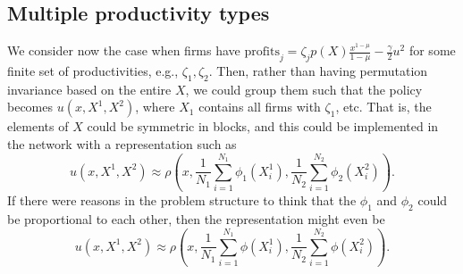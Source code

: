\documentclass[12pt]{article}
\newcommand{\mapvar}[2][map]{\csname #1#2\endcsname}
\begin{document}


\subsection{Multiple productivity types}

We consider now the case when firms have $\text{profits}_j = \zeta_j p(X)\frac{x^{1-\mu}}{1-\mu}-\frac{\gamma}{2}u^2$ for some finite set of productivities, e.g., $\zeta_1, \zeta_2$. Then, rather than having permutation invariance based on the entire $X$, we could group them such that the policy becomes $u(x, X^1, X^2)$, where $X_1$ contains all firms with $\zeta_1$, etc.  That is, the elements of $X$ could be symmetric in blocks, and this could be implemented in the network with a representation such as 
\begin{equation*}
u(x, X^1, X^2) \approx \rho \left(x, \frac{1}{N_1}\sum_{i=1}^{N_1} \phi_1(X^1_i), \frac{1}{N_2}\sum_{i=1}^{N_2} \phi_2(X^2_i)\right).
\end{equation*}
If there were reasons in the problem structure to think that the $\phi_1$ and $\phi_2$ could be proportional to each other, then the representation might even be 
\begin{equation*}
u(x, X^1, X^2) \approx \rho \left(x, \frac{1}{N_1}\sum_{i=1}^{N_1} \phi(X^1_i), \frac{1}{N_2}\sum_{i=1}^{N_2} \phi(X^2_i)\right).
\end{equation*}
\end{document}
